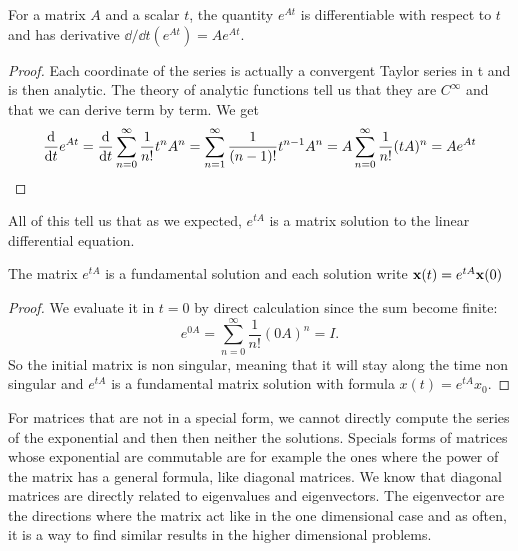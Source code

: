 \begin{theoreme}
For a matrix $A$ and a scalar $t$, the quantity $e^{At}$ is differentiable with respect to $t$ and has derivative $\dd/{\dd t} (e^{At}) = Ae^{At}$.
\end{theoreme}
\begin{proof}
Each coordinate of the series is actually a convergent Taylor series in t and is then analytic. The theory of analytic functions tell us that they are $C^\infty$ and that we can derive term by term.
 We get 
 \[ \frac{\mathrm{d}}{\mathrm{d} t} e^{At} =\frac{\mathrm{d}}{\mathrm{d} t}\sum_{n=0}^\infty\frac{1}{n!}t^nA^n
= \sum_{n=1}^\infty \frac{1}{(n-1)!}t^{n-1}A^n
= A\sum_{n=0}^\infty \frac{1}{n!}(tA)^n
=Ae^{At} \]
\end{proof}
All of this tell us that as we expected, $e^{tA}$ is a matrix solution to the linear differential equation.
\begin{corollaire}
The matrix $e^{tA}$ is a fundamental solution and each solution write $\mathbf{x}(t)=e^{tA}\mathbf{x}(0)$
\end{corollaire}
\begin{proof}
We evaluate it in $t=0$ by direct calculation since the sum become finite: 
\[e^{0A}=\sum_{n=0}^\infty \frac{1}{n!}(0A)^n = I.\]
So the initial matrix is non singular, meaning that it will stay along the time non singular and $e^{tA}$ is a fundamental matrix solution with formula $x(t)=e^{tA}x_0$.
\end{proof}

For matrices that are not in a special form, we cannot directly compute the series of the exponential and then then neither the solutions. Specials forms of matrices whose exponential are commutable are for example the ones where the power of the matrix has a general formula, like diagonal matrices. We know that diagonal matrices are directly related to eigenvalues and eigenvectors. The eigenvector are the directions where the matrix act like in the one dimensional case and as often, it is a way to find similar results in the higher dimensional problems.

